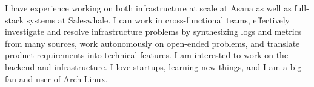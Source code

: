 

\begin{cvparagraph}

  I have experience working on both infrastructure at scale at Asana as well as full-stack systems at Saleswhale. I can work in cross-functional teams, effectively investigate and resolve infrastructure problems by synthesizing logs and metrics from many sources, work autonomously on open-ended problems, and translate product requirements into technical features. I am interested to work on the backend and infrastructure. I love startups, learning new things, and I am a big fan and user of Arch Linux.
\end{cvparagraph}
